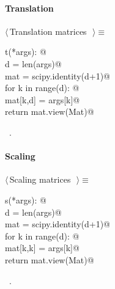 \documentclass[11pt,oneside]{article}	%
\begin{document}
\paragraph{Translation}
\begin{flushleft} \small \label{scrap24}
$\langle\,$Translation matrices\nobreak\ {\footnotesize {}}$\,\rangle\equiv$
\vspace{-1ex}
\begin{list}{}{} \item
\mbox{}\verb@def t(*args): @\\
\mbox{}\verb@   d = len(args)@\\
\mbox{}\verb@   mat = scipy.identity(d+1)@\\
\mbox{}\verb@   for k in range(d): @\\
\mbox{}\verb@      mat[k,d] = args[k]@\\
\mbox{}\verb@   return mat.view(Mat)@\\
\mbox{}\verb@@{\NWsep}
\end{list}
\vspace{-1ex}
\footnotesize\addtolength{\baselineskip}{-1ex}
\begin{list}{}{\setlength{\itemsep}{-\parsep}\setlength{\itemindent}{-\leftmargin}}
\item \NWtxtMacroRefIn\ .
\end{list}
\end{flushleft}
\paragraph{Scaling}
\begin{flushleft} \small \label{scrap25}
$\langle\,$Scaling matrices\nobreak\ {\footnotesize {}}$\,\rangle\equiv$
\vspace{-1ex}
\begin{list}{}{} \item
\mbox{}\verb@def s(*args): @\\
\mbox{}\verb@   d = len(args)@\\
\mbox{}\verb@   mat = scipy.identity(d+1)@\\
\mbox{}\verb@   for k in range(d): @\\
\mbox{}\verb@      mat[k,k] = args[k]@\\
\mbox{}\verb@   return mat.view(Mat)@\\
\mbox{}\verb@@{\NWsep}
\end{list}
\vspace{-1ex}
\footnotesize\addtolength{\baselineskip}{-1ex}
\begin{list}{}{\setlength{\itemsep}{-\parsep}\setlength{\itemindent}{-\leftmargin}}
\item \NWtxtMacroRefIn\ .
\end{list}
\end{flushleft}
\end{document}
